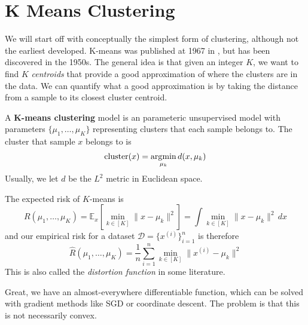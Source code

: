 \section{K Means Clustering} 

  We will start off with conceptually the simplest form of clustering, although not the earliest developed. K-means was published at 1967 in \cite{1967macqueen}, but has been discovered in the 1950s. The general idea is that given an integer $K$, we want to find $K$ \textit{centroids} that provide a good approximation of where the clusters are in the data. We can quantify what a good approximation is by taking the distance from a sample to its closest cluster centroid.

  \begin{definition}
    A \textbf{K-means clustering} model is an parameteric unsupervised model with parameters $\{\mu_1, \ldots, \mu_K\}$ representing clusters that each sample belongs to. The cluster that sample $x$ belongs to is 
    \begin{equation}
      \mathrm{cluster}(x) = \argmin_{\mu_k} d(x, \mu_k)
    \end{equation}
    Usually, we let $d$ be the $L^2$ metric in Euclidean space. 
  \end{definition}

  \begin{theorem}[Risk]
    The expected risk of $K$-means is 
    \begin{equation}
      R(\mu_1, \ldots, \mu_K) = \mathbb{E}_x \left[ \min_{k \in [K]} \| x - \mu_k \|^2 \right] = \int \min_{k \in [K]} \| x - \mu_k \|^2 \,dx
    \end{equation} 
    and our empirical risk for a dataset $\mathcal{D} = \{x^{(i)}\}_{i=1}^n$ is therefore 
    \begin{equation}
      \hat{R}(\mu_1, \ldots, \mu_K) = \frac{1}{n} \sum_{i=1}^n \min_{k \in [K]} \| x^{(i)} - \mu_k \|^2
    \end{equation} 
    This is also called the \textit{distortion function} in some literature. 
  \end{theorem} 

  Great, we have an almost-everywhere differentiable function, which can be solved with gradient methods like SGD or coordinate descent. The problem is that this is not necessarily convex. 

  \begin{theorem}
    
  \end{theorem}
  
